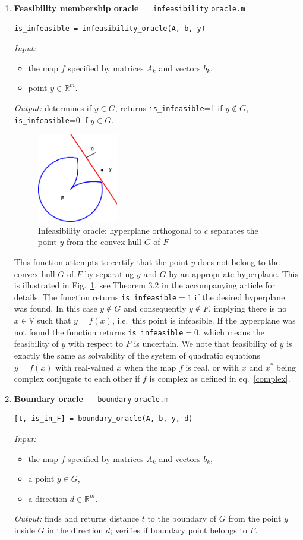 \documentclass[a4paper]{article}
\newcommand{\R}{\mathbb{R}}
\theoremstyle{definition}
\begin{document}
\begin{enumerate}
\item {\bf Feasibility membership oracle\ \ \  }{\tt \large  infeasibility$\_$oracle.m}
\begin{verbatim}
is_infeasible = infeasibility_oracle(A, b, y)
\end{verbatim}
{\it Input:}
\begin{itemize}
\item the map $f$ specified by matrices $A_k$ and vectors $b_k$,
\item point $y\in\mathbb{R}^m$.
\end{itemize}
{\it Output:} determines if $y\in G$, returns {\tt is\_infeasible}=1 if $y\notin G$, {\tt is\_infeasible}=0 if $y\in G$.

\begin{figure}[H]
	\centering\includegraphics[width=100pt]{fig/infeasibility_oracle}
	\caption{Infeasibility oracle: hyperplane orthogonal to $c$ separates the point $y$ from the convex hull $G$ of $F$}
\label{fig:one}
\end{figure}

This function attempts to certify that the point $y$ does not belong to the convex hull $G$ of $F$ by separating $y$ and $G$ by an appropriate hyperplane. This is illustrated in Fig.~\ref{fig:one}, see Theorem 3.2 in the accompanying article for details.
The function returns {\tt is\_infeasible}$=1$ if the desired hyperplane was found. In this case $y\notin G$ and consequently $y\notin F$, implying there is no $x\in \mathbb{V}$ such that $y=f(x)$, i.e.~this point is infeasible. If the hyperplane was not found the function returns {\tt is\_infeasible}$=0$, which means the feasibility  of $y$ with respect to $F$ is uncertain. We note that feasibility of $y$  is exactly the same as solvability of the system of quadratic equations $y=f(x)$ with real-valued $x$ when the map $f$ is real, or with $x$ and $x^*$ being complex conjugate to each other if $f$ is complex as defined in eq.~\eqref{complex}.

\item {\bf Boundary oracle\ \ \  }{\tt \large boundary$\_$oracle.m}
\begin{verbatim}
[t, is_in_F] = boundary_oracle(A, b, y, d)
\end{verbatim}
{\it Input:}
\begin{itemize}
	\item the map $f$ specified by matrices $A_k$ and vectors $b_k$,
	\item a point $y\in G$,
	\item a direction $d\in\R^m$.
\end{itemize}
{\it Output:}  finds and returns distance $t$ to the boundary of $G$ from the point $y$ inside $G$ in the direction $d$; verifies if boundary point belongs to $F$. 



\end{enumerate}
\end{document}
